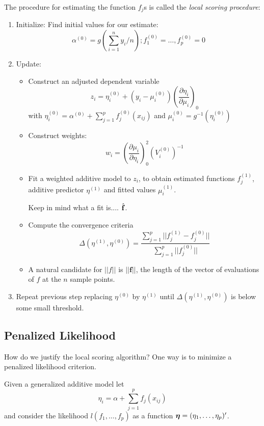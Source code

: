 The procedure for estimating the function $f_j$s is called the {\it
  local scoring procedure}:
\begin{enumerate}
\item Initialize: Find initial values for our estimate:
  \[ 
  \alpha^{(0)}=g\left(\sum_{i=1}^n y_i/n\right); f^{(0)}_1 =
  \dots,f^{(0)}_p = 0 
  \]
\item Update: 
  \begin{itemize}
  \item Construct an adjusted dependent variable
    \[
    z_i = \eta_i^{(0)} + (y_i - \mu_i^{(0)})  
    \left( \frac{\partial \eta_i}{\partial \mu_i} \right)_0
    \]
    with $\eta_i^{(0)} = \alpha^{(0)} + \sum_{j=1}^p f^{(0)}_j(x_{ij})$ and $\mu_i^{(0)} =
    g^{-1}(\eta_i^{(0)})$
    
  \item  Construct weights:
    \[
    w_i =  \left( \frac{\partial \mu_i}{\partial \eta_i} \right)^2_0
    (V_i^{(0)})^{-1} 
    \]
    
  \item  Fit a weighted additive model to $z_i$, to obtain estimated
    functions $f_j^{(1)}$, additive predictor $\eta^{(1)}$ and fitted
    values $\mu^{(1)}_i$.  

    Keep in mind what a fit is.... $\hat{{\mathbf f}}$.
  \item  Compute the convergence criteria
    \[
    \Delta(\eta^{(1)},\eta^{(0)}) = \frac{\sum_{j=1}^p || f_j^{(1)} -
    f_j^{(0)} ||} {\sum_{j=1}^p ||f^{(0)}_j||}
    \]
  \item  A natural candidate for $||f||$ is $||\mathbf{f}||$, the
    length of the vector of evaluations of $f$ at the $n$ sample points.
  \end{itemize}
\item Repeat previous step replacing $\eta^{(0)}$ by $\eta^{(1)}$ until
  $\Delta(\eta^{(1)},\eta^{(0)})$ is below some small threshold.
\end{enumerate}


\subsection{Penalized Likelihood}
How do we justify the local scoring algorithm? One way is to minimize
a penalized likelihood criterion.

Given a generalized additive model let 
\[
\eta_i = \alpha + \sum_{j=1}^p f_j(x_{ij})
\]
and consider the 
likelihood $l(f_1,\dots,f_p)$ as a function $\mbox{\boldmath $\eta$\unboldmath} =
(\eta_1,\dots,\eta_p)'$. 

